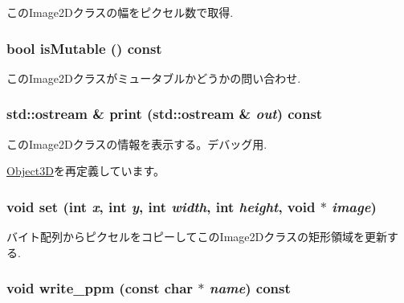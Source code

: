 このImage2Dクラスの幅をピクセル数で取得. \hypertarget{classm3g_1_1Image2D_d687aabba553d1c66bfc253ec7e5bd05}{
\subsubsection[{isMutable}]{\setlength{\rightskip}{0pt plus 5cm}bool isMutable () const}}
\label{classm3g_1_1Image2D_d687aabba553d1c66bfc253ec7e5bd05}


このImage2Dクラスがミュータブルかどうかの問い合わせ. \hypertarget{classm3g_1_1Image2D_6fea17fa1532df3794f8cb39cb4f911f}{
\subsubsection[{print}]{\setlength{\rightskip}{0pt plus 5cm}std::ostream \& print (std::ostream \& {\em out}) const}}
\label{classm3g_1_1Image2D_6fea17fa1532df3794f8cb39cb4f911f}


このImage2Dクラスの情報を表示する。デバッグ用. 

\hyperlink{classm3g_1_1Object3D_6fea17fa1532df3794f8cb39cb4f911f}{Object3D}を再定義しています。\hypertarget{classm3g_1_1Image2D_fe9ef1abefb9e92b38687e27c9004bdc}{
\subsubsection[{set}]{\setlength{\rightskip}{0pt plus 5cm}void set (int {\em x}, \/  int {\em y}, \/  int {\em width}, \/  int {\em height}, \/  void $\ast$ {\em image})}}
\label{classm3g_1_1Image2D_fe9ef1abefb9e92b38687e27c9004bdc}


バイト配列からピクセルをコピーしてこのImage2Dクラスの矩形領域を更新する. \hypertarget{classm3g_1_1Image2D_32ee5b2bcc9c7bf69b925413eeccb4bf}{
\subsubsection[{write\_\-ppm}]{\setlength{\rightskip}{0pt plus 5cm}void write\_\-ppm (const char $\ast$ {\em name}) const}}
\label{classm3g_1_1Image2D_32ee5b2bcc9c7bf69b925413eeccb4bf}


